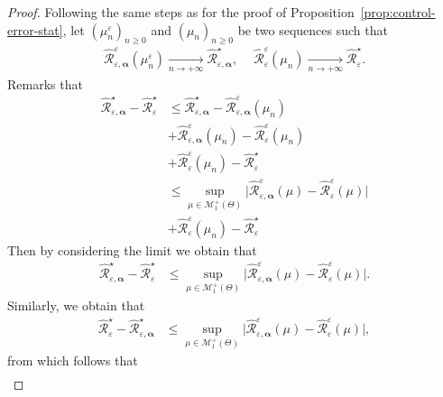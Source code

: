 \begin{proof}
Following the same steps as for the proof of Proposition~\ref{prop:control-error-stat}, let $(\mu_n^{\varepsilon})_{n\geq 0}$ and $(\mu_n)_{n\geq 0}$ be two sequences such that
\begin{align*}
    \widehat{\mathcal{R}}_{\varepsilon,\bm{\alpha}}^{\varepsilon}(\mu_n^{\varepsilon})\xrightarrow[n \to +\infty]{}\widehat{\mathcal{R}}_{\varepsilon,\bm{\alpha}}^{\star},~\quad \widehat{\mathcal{R}}_{\varepsilon}^{\varepsilon}(\mu_n)\xrightarrow[n \to +\infty]{}\widehat{\mathcal{R}}_{\varepsilon}^{\star}.
\end{align*}
Remarks that 
\begin{align*}
  \widehat{\mathcal{R}}_{\varepsilon,\bm{\alpha}}^{\star} - \widehat{\mathcal{R}}_{\varepsilon}^{\star}&\leq \widehat{\mathcal{R}}_{\varepsilon,\bm{\alpha}}^{\star} - \widehat{\mathcal{R}}_{\varepsilon,\bm{\alpha}}^{\varepsilon}(\mu_n)\\
  & + \widehat{\mathcal{R}}_{\varepsilon,\bm{\alpha}}^{\varepsilon}(\mu_n) -   \widehat{\mathcal{R}}_{\varepsilon}^{\varepsilon}(\mu_n)\\
  &+ \widehat{\mathcal{R}}_{\varepsilon}^{\varepsilon}(\mu_n)-\widehat{\mathcal{R}}_{\varepsilon}^{\star}\\
  &\leq \sup_{\mu\in\mathcal{M}_1^{+}(\Theta)}\Big|\widehat{\mathcal{R}}_{\varepsilon,\bm{\alpha}}^{\varepsilon}(\mu) -   \widehat{\mathcal{R}}_{\varepsilon}^{\varepsilon}(\mu)  \Big|\\
  & + \widehat{\mathcal{R}}_{\varepsilon}^{\varepsilon}(\mu_n)-\widehat{\mathcal{R}}_{\varepsilon}^{\star}
\end{align*}
Then by considering the limit we obtain that 
\begin{align*}
    \widehat{\mathcal{R}}_{\varepsilon,\bm{\alpha}}^{\star} - \widehat{\mathcal{R}}_{\varepsilon}^{\star}&\leq \sup_{\mu\in\mathcal{M}_1^{+}(\Theta)}\Big|\widehat{\mathcal{R}}_{\varepsilon,\bm{\alpha}}^{\varepsilon}(\mu) -   \widehat{\mathcal{R}}_{\varepsilon}^{\varepsilon}(\mu)  \Big|.
\end{align*}
Similarly, we obtain that 
\begin{align*}
     \widehat{\mathcal{R}}_{\varepsilon}^{\star}-\widehat{\mathcal{R}}_{\varepsilon,\bm{\alpha}}^{\star}&\leq \sup_{\mu\in\mathcal{M}_1^{+}(\Theta)}\Big|\widehat{\mathcal{R}}_{\varepsilon,\bm{\alpha}}^{\varepsilon}(\mu) -   \widehat{\mathcal{R}}_{\varepsilon}^{\varepsilon}(\mu)  \Big|,
\end{align*}
from which follows that
\begin{align*}

\end{align*}
\end{proof}
